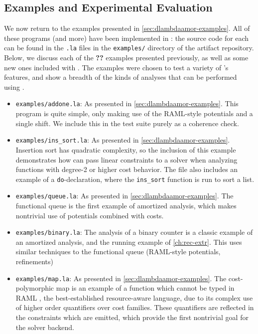 \subsection{Examples and Experimental Evaluation}
We now return to the examples presented in \autoref{sec:dlambdaamor-examples}. All of these programs (and more) have been implemented in \lambdaamorimpl: the source code for each can be found in the \texttt{.la} files in the \texttt{examples/} directory of the artifact repository. Below, we discuss each of the \textbf{??} examples presented previously, as well as some new ones included with \lambdaamorimpl. The examples were chosen to test a variety of \lambdaamorimpl's features, and show a breadth of the kinds of analyses that can be performed using \lambdaamorimpl.

\begin{itemize}
  \item \texttt{examples/addone.la}: As presented in \autoref{sec:dlambdaamor-examples}. This program is quite simple, only making use of the RAML-style potentials and a single shift. We include this in the test suite purely as a coherence check.
  \item \texttt{examples/ins_sort.la}: As presented in \autoref{sec:dlambdaamor-examples}. Insertion sort has quadratic complexity, so the inclusion of this example demonstrates how \lambdaamorimpl can pass linear constraints to a solver when analyzing functions with degree-2 or higher cost behavior. The file also includes an example of a \texttt{do}-declaration, where the \texttt{ins_sort} function is run to sort a list.
  \item \texttt{examples/queue.la}: As presented in \autoref{sec:dlambdaamor-examples}. The functional queue is the first example of amortized analysis, which makes nontrivial use of potentials combined with costs.
  \item \texttt{examples/binary.la}: The analysis of a binary counter is a classic example of an amortized analysis, and the running example of \autoref{ch:rec-extr}. This uses similar techniques to the functional queue (RAML-style potentials, refinements)
  \item \texttt{examples/map.la}: As presented in \autoref{sec:dlambdaamor-examples}. The cost-polymorphic map is an example of a function which cannot be typed in RAML \citehere, the best-established resource-aware language, due to its complex use of higher order quantifiers over cost families. These quantifiers are reflected in the constraints which are emitted, which provide the first nontrivial goal for the solver backend.

\end{itemize}
